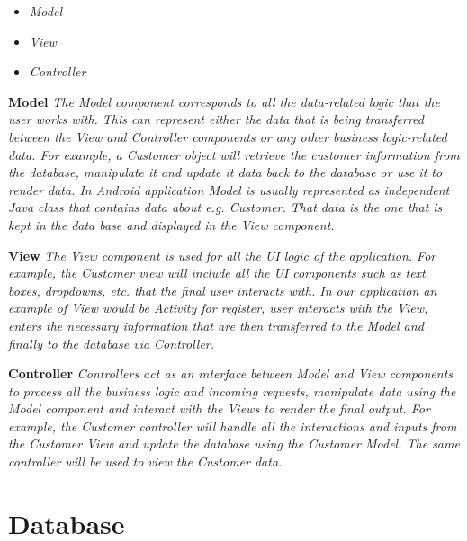 		\begin{itemize}
			\item 	\textit{Model}
			\item 	\textit{View }
			\item 	\textit{Controller}		
		\end{itemize}

		\textbf{Model}
		\textit{The Model component corresponds to all the data-related logic that the user works with. This can represent either the data that is being transferred between the View and Controller components or any other business logic-related data. For example, a Customer object will retrieve the customer information from the database, manipulate it and update it data back to the database or use it to render data. 
In Android application Model is usually represented as independent Java class that contains data about e.g. Customer. That data is the one that is kept in the data base and displayed in the View component. }

		\textbf{View}
		 \textit{The View component is used for all the UI logic of the application. For example, the Customer view will include all the UI components such as text boxes, dropdowns, etc. that the final user interacts with. 
In our application an example of View would be Activity for register, user interacts with the View, enters the necessary information that are then transferred to the Model and finally to the database via Controller.}

		\textbf{Controller}
		\textit{Controllers act as an interface between Model and View components to process all the business logic and incoming requests, manipulate data using the Model component and interact with the Views to render the final output. For example, the Customer controller will handle all the interactions and inputs from the Customer View and update the database using the Customer Model. The same controller will be used to view the Customer data.}
	
		

		
\pagebreak
				
		\section{Database}
			
